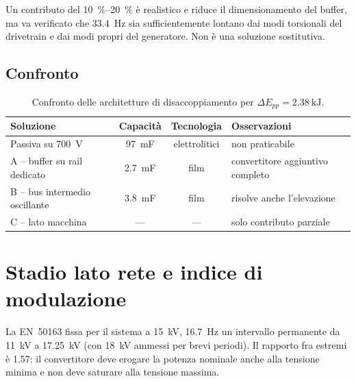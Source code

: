Un contributo del \SI{10}{\percent}--\SI{20}{\percent} è realistico e riduce il
dimensionamento del buffer, ma va verificato che \SI{33.4}{\hertz} sia sufficientemente
lontano dai modi torsionali del drivetrain e dai modi propri del generatore. Non è una
soluzione sostitutiva.

\subsection{Confronto}

\begin{table}[h]
\centering
\begin{tabular}{lccl}
\toprule
Soluzione & Capacità & Tecnologia & Osservazioni \\
\midrule
Passiva su \SI{700}{\volt}      & \SI{97}{\milli\farad} & elettrolitici & non praticabile \\
A -- buffer su rail dedicato     & \SI{2.7}{\milli\farad} & film & convertitore aggiuntivo completo \\
B -- bus intermedio oscillante   & \SI{3.8}{\milli\farad} & film & risolve anche l'elevazione \\
C -- lato macchina               & ---                    & ---  & solo contributo parziale \\
\bottomrule
\end{tabular}
\caption{Confronto delle architetture di disaccoppiamento per $\Delta E_{pp}=\SI{2.38}{\kilo\joule}$.}
\end{table}

\section{Stadio lato rete e indice di modulazione}
\label{afe167:sec:modulazione}

La EN~50163 \cite{en50163} fissa per il sistema a \SI{15}{\kilo\volt},
\SI{16.7}{\hertz} un intervallo permanente da \SI{11}{\kilo\volt} a
\SI{17.25}{\kilo\volt} (con \SI{18}{\kilo\volt} ammessi per brevi periodi). Il rapporto
fra estremi è \num{1.57}: il convertitore deve erogare la potenza nominale anche alla
tensione minima e non deve saturare alla tensione massima.

